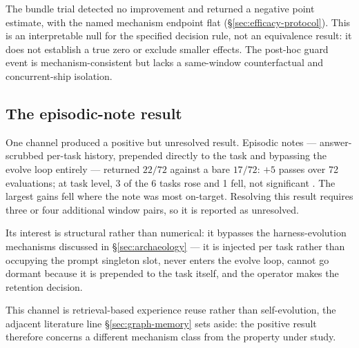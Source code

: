 The bundle trial detected no improvement and returned a negative point
estimate, with the named mechanism endpoint flat
(\S\ref{sec:efficacy-protocol}). This is an interpretable null for the
specified decision rule, not an equivalence result: it does not
establish a true zero or exclude smaller effects. The post-hoc guard
event is mechanism-consistent but lacks a same-window counterfactual
and concurrent-ship isolation.



\subsection{The episodic-note result}
\label{sec:survivor}

One channel produced a positive but unresolved result. Episodic notes ---
answer-scrubbed per-task history, prepended directly to the task and
bypassing the evolve loop entirely --- returned $22/72$ against a bare
$17/72$: $+5$ passes over 72 evaluations; at task level, 3 of the 6 tasks
rose and 1 fell, not significant . The largest gains fell where the
note was most on-target. Resolving this result requires three or four additional window
pairs, so it is reported as unresolved.

Its interest is structural rather than numerical: it bypasses the
harness-evolution mechanisms discussed in \S\ref{sec:archaeology} --- it
is injected per task rather than occupying the prompt singleton slot, never
enters the evolve loop, cannot go dormant because it is prepended to the
task itself, and the operator makes the retention decision.

This channel is retrieval-based experience reuse rather than
self-evolution, the adjacent literature line
\S\ref{sec:graph-memory} sets aside: the positive result therefore concerns a different
mechanism class from the property under study.
